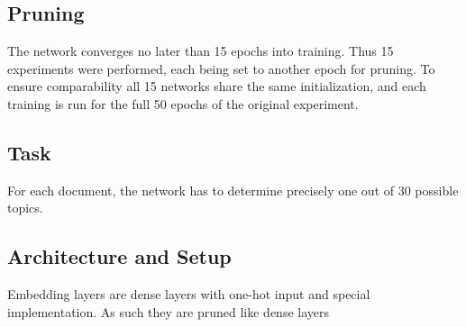 \subsection*{Pruning}
The network converges no later than 15 epochs into training. Thus 15 experiments were performed, each being set to another epoch for pruning. 
To ensure comparability all 15 networks share the same initialization, and each training is run for the full  50 epochs of the original experiment.



\subsection*{Task}
For each document, the network has to determine precisely one out of 30 possible topics.

\subsection*{Architecture and Setup}
Embedding layers are dense layers with one-hot input and special implementation. As such they are pruned like dense layers

